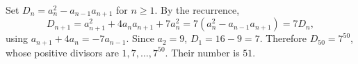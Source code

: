Set $D_n=a_n^2-a_{n-1}a_{n+1}$ for $n\ge1$. By the recurrence,
\[D_{n+1}=a_{n+1}^2+4a_na_{n+1}+7a_n^2=7(a_n^2-a_{n-1}a_{n+1})=7D_n,\]
using $a_{n+1}+4a_n=-7a_{n-1}$. Since $a_2=9$, $D_1=16-9=7$. Therefore $D_{50}=7^{50}$, whose positive divisors are $1,7,\ldots,7^{50}$. Their number is $\boxed{51}$.

